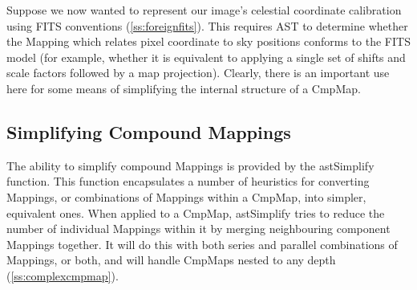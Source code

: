 \documentclass[twoside,11pt]{article}
\newcommand{\htmlref}[2]{#1}
\newcommand{\secref}[1]{\S\ref{#1}}
\renewcommand{\secref}[1]{\ref{#1}}
\begin{document}
Suppose we now wanted to represent our image's celestial coordinate
calibration using FITS conventions (\secref{ss:foreignfits}). This
requires AST to determine whether the Mapping which relates pixel
coordinate to sky positions conforms to the FITS model (for example,
whether it is equivalent to applying a single set of shifts and scale
factors followed by a map projection). Clearly, there is an important
use here for some means of simplifying the internal structure of a
CmpMap.

\subsection{\label{ss:simplifyingcmpmaps}Simplifying Compound Mappings}

The ability to simplify compound Mappings is provided by the
\htmlref{astSimplify}{astSimplify} function. This function encapsulates a number of
heuristics for converting Mappings, or combinations of Mappings within
a \htmlref{CmpMap}{CmpMap}, into simpler, equivalent ones. When applied to a CmpMap,
astSimplify tries to reduce the number of individual Mappings within
it by merging neighbouring component Mappings together. It will do
this with both series and parallel combinations of Mappings, or both,
and will handle CmpMaps nested to any depth
(\secref{ss:complexcmpmap}).
\end{document}
